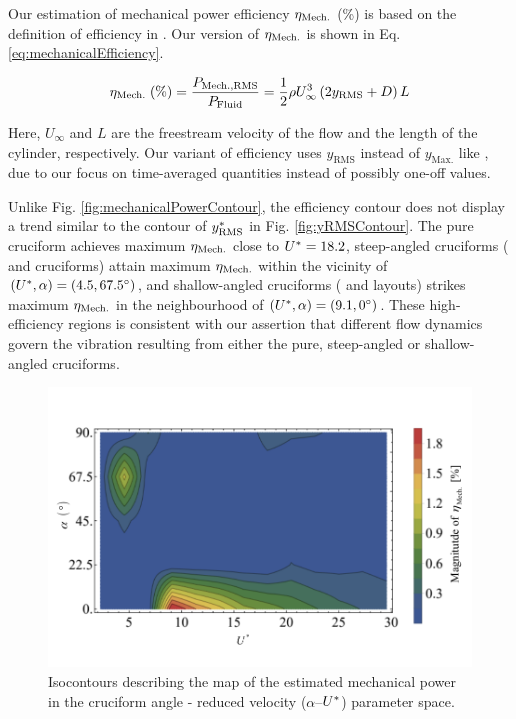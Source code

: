 \documentclass[oneside]{utmthesis}
\begin{document}
Our estimation of mechanical power efficiency $\eta_{\text{Mech.}}$ (\%) is based on the definition of efficiency in \citet{Sun2018}. Our version of $\eta_{\text{Mech.}}$ is shown in Eq. \ref{eq:mechanicalEfficiency}.

\begin{equation}
  \eta_{\text{Mech.}} \;(\%) = \frac{P_{\text{Mech.,RMS}}}{P_{\text{Fluid}}} = \frac{1}{2}\rho U^{3}_{\infty} \left( 2 y_{\text{RMS}} + D \right) L
  \label{eq:mechanicalEfficiency}
\end{equation}

\noindent Here, $U_{\infty}$ and $L$ are the freestream velocity of the flow and the length of the cylinder, respectively. Our variant of efficiency uses $y_{\text{RMS}}$ instead of $y_{\text{Max.}}$ like \citet{Sun2018}, due to our focus on time-averaged quantities instead of possibly one-off values.

Unlike Fig. \ref{fig:mechanicalPowerContour}, the efficiency contour does not display a trend similar to the contour of $y^{*}_{\text{RMS}}$ in Fig. \ref{fig:yRMSContour}. The pure cruciform achieves maximum $\eta_{\text{Mech.}}$ close to $U^{*} = 18.2$, steep-angled cruciforms (\angfo{} and \angth{} cruciforms) attain maximum $\eta_{\text{Mech.}}$ within the vicinity of $(\ured,\alpha) = (\urtw,\angfo)$, and shallow-angled cruciforms (\angtw{} and \angon{} layouts) strikes maximum $\eta_{\text{Mech.}}$ in the neighbourhood of $(\ured,\alpha) = (\urfo,\angon)$. These high-efficiency regions is consistent with our assertion that different flow dynamics govern the vibration resulting from either the pure, steep-angled or shallow-angled cruciforms.

\begin{figure}
  \centering
  \includegraphics[width=1\textwidth]{figs/powerEfficiencyContours}
  \caption{Isocontours describing the map of the estimated mechanical power in the cruciform angle - reduced velocity ($\alpha$--$U^{*}$) parameter space.}
  \label{fig:powerEfficiencyContour}
\end{figure}
\end{document}
